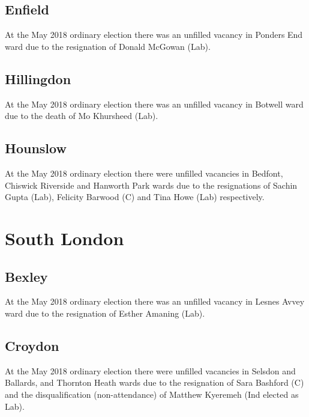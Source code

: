 \documentclass[a4paper,openany]{book}
\begin{document}
\begin{resultsiii}
\subsection*{Enfield}

At the May 2018 ordinary election there was an unfilled vacancy in Ponders End ward due to the resignation of Donald McGowan (Lab).

\subsection*{Hillingdon}

At the May 2018 ordinary election there was an unfilled vacancy in Botwell ward due to the death of Mo Khursheed (Lab).

\subsection*{Hounslow}

At the May 2018 ordinary election there were unfilled vacancies in Bedfont, Chiswick Riverside and Hanworth Park wards due to the resignations of Sachin Gupta (Lab), Felicity Barwood (C) and Tina Howe (Lab) respectively.

\section{South London}

\subsection*{Bexley}

At the May 2018 ordinary election there was an unfilled vacancy in Lesnes Avvey ward due to the resignation of Esther Amaning (Lab).

\subsection*{Croydon}

At the May 2018 ordinary election there were unfilled vacancies in Selsdon and Ballards, and Thornton Heath wards due to the resignation of Sara Bashford (C) and the disqualification (non-attendance) of Matthew Kyeremeh (Ind elected as Lab).


\end{resultsiii}
\end{document}
